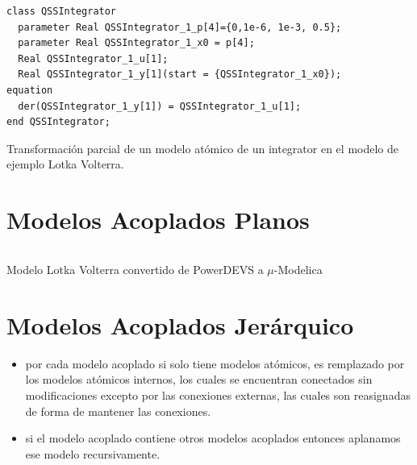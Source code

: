 \documentclass{beamer}
\begin{document}
\begin{frame}[fragile]
\begin{listing}[H]
\begin{verbatim}
class QSSIntegrator
  parameter Real QSSIntegrator_1_p[4]={0,1e-6, 1e-3, 0.5};
  parameter Real QSSIntegrator_1_x0 = p[4];
  Real QSSIntegrator_1_u[1];
  Real QSSIntegrator_1_y[1](start = {QSSIntegrator_1_x0});
equation
  der(QSSIntegrator_1_y[1]) = QSSIntegrator_1_u[1];
end QSSIntegrator;
\end{verbatim}
\caption{Transformación parcial de un modelo atómico de un integrator en el modelo de ejemplo Lotka Volterra.}\label{lst:integradorparametros}
\end{listing}
\end{frame}

\section{Modelos Acoplados Planos}
\begin{frame}[fragile]
\begin{listing}[H]
        \inputminted[linenos]{modelica}{src/lotka_volterra-orig.mo}
        \caption{Modelo Lotka Volterra convertido de PowerDEVS a $\mu$-Modelica}
        \label{lst:lotka_volterra-orig.mo}
\end{listing}
\end{frame}

\section{Modelos Acoplados Jerárquico}
\begin{frame}
        \begin{itemize}
                \item por cada modelo acoplado si solo tiene modelos atómicos, es remplazado por los modelos atómicos internos, los cuales se encuentran conectados 
                        sin modificaciones excepto por las conexiones externas, las cuales son reasignadas de forma de mantener las conexiones.
                \item si el modelo acoplado contiene otros modelos acoplados entonces aplanamos ese modelo recursivamente.
        \end{itemize} 
\end{frame}
\end{document}
